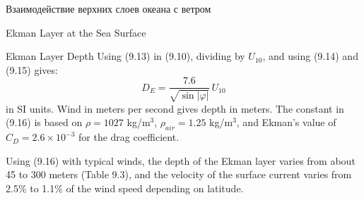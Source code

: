 \begin{chapter}{Взаимодействие верхних слоев океана с ветром}
\begin{section}{Ekman Layer at the Sea Surface}
\begin{paragraph}{Ekman Layer Depth}
Using (9.13) in (9.10), dividing by $U_{10}$, and using (9.14) and
(9.15) gives:
\begin{equation}
 D_E = \frac{7.6}{\sqrt{\sin|\varphi|}}\, U_{10}
\end{equation}
in SI units. Wind in meters per second gives depth in meters. The
constant in (9.16) is based on $\rho = 1027 $ kg/m$^3$, $\rho_{air} =
1.25 $ kg/m$^3$, and Ekman's value of $C_D = 2.6 \times 10^{-3}$ for
the drag coefficient.
%

Using (9.16) with typical winds, the depth of the Ekman layer varies
from about 45 to 300 meters (Table 9.3), and the velocity of the
surface current varies from 2.5\% to 1.1\% of the wind speed depending
on latitude.
%


\end{paragraph}
\end{section}
\end{chapter}
